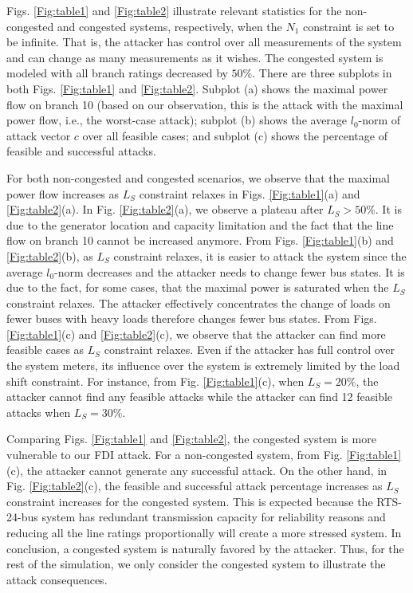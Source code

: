 \documentclass[twocolumn,english,final,journal]{IEEEtran}
\theoremstyle{plain}
\theoremstyle{definition}
\begin{document}
Figs. \ref{Fig:table1} and \ref{Fig:table2} illustrate relevant
statistics for the non-congested and congested systems, respectively,
when the $N_{1}$ constraint is set to be infinite. That is, the attacker
has control over all measurements of the system and can change as
many measurements as it wishes. The congested system is modeled with
all branch ratings decreased by $50\%$. There are three subplots
in both Figs. \ref{Fig:table1} and \ref{Fig:table2}. Subplot (a)
shows the maximal power flow on branch 10 (based on our observation,
this is the attack with the maximal power flow, i.e., the worst-case
attack); subplot (b) shows the average $l_{0}$-norm of attack vector
$c$ over all feasible cases; and subplot (c) shows the percentage
of feasible and successful attacks. 

For both non-congested and congested scenarios, we observe that the
maximal power flow increases as $L_{S}$ constraint relaxes in Figs.
\ref{Fig:table1}(a) and \ref{Fig:table2}(a). In Fig. \ref{Fig:table2}(a),
we observe a plateau after $L_{S}>50\%$. It is due to the generator
location and capacity limitation and the fact that the line flow on
branch 10 cannot be increased anymore. From Figs. \ref{Fig:table1}(b)
and \ref{Fig:table2}(b), as $L_{S}$ constraint relaxes, it is easier
to attack the system since the average $l_{0}$-norm decreases and
the attacker needs to change fewer bus states. It is due to the fact, for some cases, that the maximal power is saturated when the $L_S$ constraint relaxes. The attacker effectively concentrates the change of loads on fewer buses with heavy loads therefore changes fewer bus states. 
 From Figs. \ref{Fig:table1}(c)
and \ref{Fig:table2}(c), we observe that the attacker can find more
feasible cases as $L_{S}$ constraint relaxes. Even if the attacker
has full control over the system meters, its influence over the system
is extremely limited by the load shift constraint. For instance, from
Fig. \ref{Fig:table1}(c), when $L_{S}=20\%$, the attacker cannot
find any feasible attacks while the attacker can find 12 feasible
attacks when $L_{S}=30\%$.

Comparing Figs. \ref{Fig:table1} and \ref{Fig:table2}, the congested
system is more vulnerable to our FDI attack. For a non-congested system,
from Fig. \ref{Fig:table1}(c), the attacker cannot generate any successful
attack. On the other hand, in Fig. \ref{Fig:table2}(c), the feasible
and successful attack percentage increases as $L_{S}$ constraint
increases for the congested system. This is expected because the RTS-24-bus
system has redundant transmission capacity for reliability reasons
and reducing all the line ratings proportionally will create a more
stressed system. In conclusion, a congested system
is naturally favored by the attacker. Thus, for the rest of the simulation,
we only consider the congested system to illustrate the attack consequences. 
\end{document}
